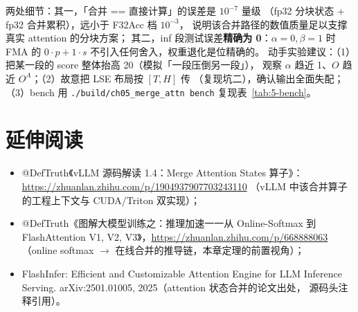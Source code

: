 两处细节：其一，「合并 == 直接计算」的误差是 $10^{-7}$ 量级
（fp32 分块状态 + fp32 合并累积），远小于 F32Acc 档 $10^{-3}$，
说明该合并路径的数值质量足以支撑真实 attention 的分块方案；
其二，inf 段测试误差\textbf{精确为 0}：$\alpha = 0, \beta = 1$ 时
FMA 的 $0 \cdot p + 1 \cdot s$ 不引入任何舍入，权重退化是位精确的。
动手实验建议：（1）把某一段的 score 整体抬高 20（模拟「一段压倒另一段」），
观察 $\alpha$ 趋近 1、$O$ 趋近 $O^{A}$；（2）故意把 LSE 布局按 $[T, H]$ 传
（复现坑二），确认输出全面失配；（3）bench 用
\texttt{.\allowbreak{}/\allowbreak{}build/\allowbreak{}ch05\_\allowbreak{}merge\_\allowbreak{}attn bench} 复现表~\ref{tab:5-bench}。

\section*{延伸阅读}

\begin{itemize}
  \item @DefTruth《vLLM 源码解读 1.4：Merge Attention States 算子》：
        \newline \url{https://zhuanlan.zhihu.com/p/1904937907703243110}
        （vLLM 中该合并算子的工程上下文与 CUDA/Triton 双实现）；
  \item @DefTruth《图解大模型训练之：推理加速一一从 Online-Softmax 到 FlashAttention
        V1, V2, V3》，\url{https://zhuanlan.zhihu.com/p/668888063}
        （online softmax $\to$ 在线合并的推导链，本章定理的前置视角）；
  \item FlashInfer: Efficient and Customizable Attention Engine for LLM
        Inference Serving. arXiv:2501.01005, 2025（attention 状态合并的论文出处，
        源码头注释引用）。
\end{itemize}
